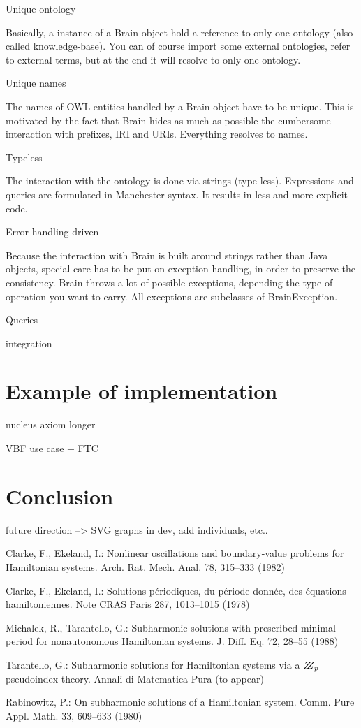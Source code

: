 \documentclass{llncs}
\begin{document}
Unique ontology

Basically, a instance of a Brain object hold a reference to only one 
ontology (also called knowledge-base). You can of course import some external 
ontologies, refer to external terms, but at the end it will resolve to only one ontology.

Unique names

The names of OWL entities handled by a Brain object have to be unique. 
This is motivated by the fact that Brain hides as much as possible the cumbersome
 interaction with prefixes, IRI and URIs. Everything resolves to names.

Typeless

The interaction with the ontology is done via strings (type-less). 
Expressions and queries are formulated in Manchester syntax. It results 
in less and more explicit code.

Error-handling driven

Because the interaction with Brain is built around strings rather than Java objects, 
special care has to be put on exception handling, in order to preserve the consistency. Brain 
throws a lot of possible exceptions, depending the type of operation you want to carry. 
All exceptions are subclasses of BrainException.

Queries

integration

\section{Example of implementation}

nucleus axiom longer 

VBF use case + FTC

\section{Conclusion}

future direction --> SVG graphs in dev, add individuals, etc..


%
\begin{thebibliography}{5}
%
Clarke, F., Ekeland, I.:
Nonlinear oscillations and
boundary-value problems for Hamiltonian systems.
Arch. Rat. Mech. Anal. 78, 315--333 (1982)

Clarke, F., Ekeland, I.:
Solutions p\'{e}riodiques, du
p\'{e}riode donn\'{e}e, des \'{e}quations hamiltoniennes.
Note CRAS Paris 287, 1013--1015 (1978)

Michalek, R., Tarantello, G.:
Subharmonic solutions with prescribed minimal
period for nonautonomous Hamiltonian systems.
J. Diff. Eq. 72, 28--55 (1988)

Tarantello, G.:
Subharmonic solutions for Hamiltonian
systems via a $\bbbz_{p}$ pseudoindex theory.
Annali di Matematica Pura (to appear)

Rabinowitz, P.:
On subharmonic solutions of a Hamiltonian system.
Comm. Pure Appl. Math. 33, 609--633 (1980)

\end{thebibliography}
\end{document}
